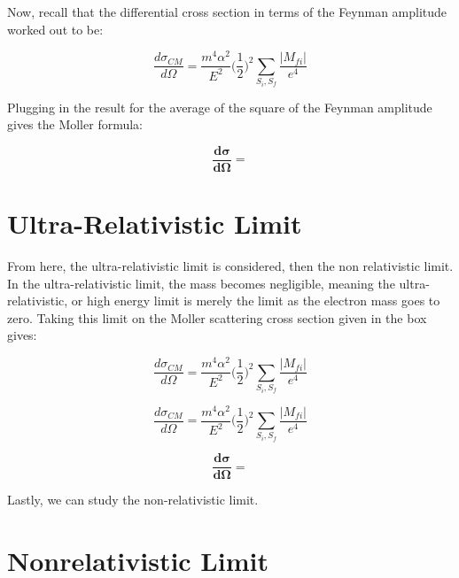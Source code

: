 \documentclass[a4]{article}
\begin{document}
    Now, recall that the differential cross section in terms of the Feynman amplitude worked out to be:

    \begin{equation}
        \frac{d \sigma_{CM}}{d \Omega} = \frac{m^4 \alpha^2}{E^2} \bigg( \frac{1}{2} \bigg)^2 \sum_{S_i, S_f} \frac{|M_{fi}|}{e^4}
    \end{equation}

    Plugging in the result for the average of the square of the Feynman amplitude gives the Moller formula:

    \begin{framed}
        \begin{equation}
            \mathbf{\frac{d \sigma}{d \Omega} = }
        \end{equation}
    \end{framed}

    \section*{Ultra-Relativistic Limit}

    From here, the ultra-relativistic limit is considered, then the non relativistic limit. In the ultra-relativistic limit, the mass becomes negligible, meaning the ultra-relativistic, or high energy limit is merely the limit as the electron
    mass goes to zero. Taking this limit on the Moller scattering cross section given in the box gives:

    \begin{equation}
        \frac{d \sigma_{CM}}{d \Omega} = \frac{m^4 \alpha^2}{E^2} \bigg( \frac{1}{2} \bigg)^2 \sum_{S_i, S_f} \frac{|M_{fi}|}{e^4}
    \end{equation}

    \begin{equation}
        \frac{d \sigma_{CM}}{d \Omega} = \frac{m^4 \alpha^2}{E^2} \bigg( \frac{1}{2} \bigg)^2 \sum_{S_i, S_f} \frac{|M_{fi}|}{e^4}
    \end{equation}

    \begin{framed}
        \begin{equation}
            \mathbf{\frac{d \sigma}{d \Omega} = }
        \end{equation}
    \end{framed}

    Lastly, we can study the non-relativistic limit.
        
    \section*{Nonrelativistic Limit}
\end{document}
